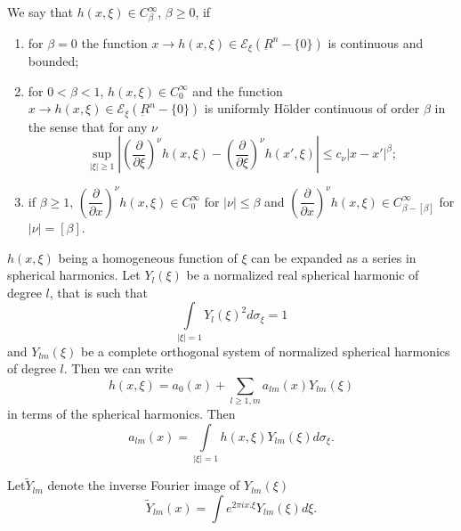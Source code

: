 We say that $h(x, \xi ) \in C_\beta ^\infty$, $\beta \geq 0$, if  
\begin{enumerate}
\renewcommand{\labelenumi}{(\theenumi)}
\item for $\beta = 0$ the function $x \to h(x, \xi ) \in
  \mathscr{E}_\xi (\underbar{R}^n - \{ 0 \})$ is continuous and
  bounded;  

\item for $0 < \beta < 1$, $h (x, \xi ) \in C^\infty _0$ and the
  function $ x \to h(x, \xi ) \in \mathscr{E}_\xi (\underbar{R}^n - \{
  0 \} )$ is uniformly H\"older continuous of order $ \beta$ in the
  sense that for any $\nu$ 
\begin{equation*}
\sup_{| \xi | \geq 1} \left|\left(\frac{\partial}{\partial
  \xi}\right)^\nu h(x, \xi ) - \left(\frac{\partial}{\partial
  \xi}\right)^\nu h(x', \xi ) \right| \leq c_\nu 
|x-x'|^\beta ; \tag{4.4} \label{chap4-eq4.4}
\end{equation*}

\item if $ \beta \geq 1$, $\left(\dfrac{\partial}{\partial
  x}\right)^\nu h(x, \xi ) \in C^\infty _0$ for $ | \nu| \leq \beta $ and
  $\left(\dfrac{\partial}{\partial x}\right)^\nu h(x, \xi ) \in C^\infty _{\beta
  - [\beta]}$ for $ |\nu | = [\beta]$.  
\end{enumerate}
$h (x, \xi )$ being a homogeneous function of $\xi$ can be expanded 
as a series in spherical harmonics. Let $Y_l(\xi)$ be a normalized
real spherical harmonic of degree $l$, that is such that  
\begin{equation*}
\int\limits_{| \xi | = 1} Y_l (\xi )^2 d \sigma_\xi = 1
\tag{4.5}\label{chap4-eq4.5} 
\end{equation*}
and $ Y_{lm}(\xi )$ be a complete orthogonal system of normalized
spherical harmonics of degree $l$. Then we can write  
\begin{equation*}
h(x, \xi ) = a_0 (x) + \sum _{ l \geq 1, m} a_{lm} (x) Y_{lm} ( \xi )
\tag{4.6} \label{chap3-eq4.6}
\end{equation*}
in terms of the spherical harmonics. Then 
\begin{equation*}
a_{lm}(x) = \int\limits_{|\xi | =1} h (x, \xi ) Y_{lm}(\xi )d
\sigma_\xi. \tag{4.7} \label{chap4-eq4.7}
\end{equation*}

Let\pageoriginale $ \widetilde{Y}_{lm}$ denote the inverse Fourier
image of $ Y_{lm}(\xi)$  
$$
\widetilde{Y}_{lm}(x) = \int e^{2 \pi ix. \xi} {Y}_{lm} (\xi ) d \xi.
$$

